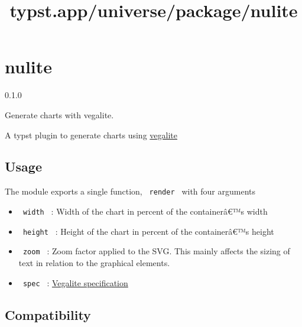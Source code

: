 \title{typst.app/universe/package/nulite}

\label{banner}
\section{nulite}\label{nulite}

{ 0.1.0 }

Generate charts with vegalite.

\label{readme}
A typst plugin to generate charts using
\href{https://vega.github.io/vega-lite/}{vegalite}

\subsection{Usage}\label{usage}

\begin{Shaded}
\begin{Highlighting}[]

\NormalTok{  )}
\end{Highlighting}
\end{Shaded}


The module exports a single function, \texttt{\ render\ } with four
arguments

\begin{itemize}
\tightlist
\item
  \texttt{\ width\ } : Width of the chart in percent of the
  containerâ€™s width
\item
  \texttt{\ height\ } : Height of the chart in percent of the
  containerâ€™s height
\item
  \texttt{\ zoom\ } : Zoom factor applied to the SVG. This mainly
  affects the sizing of text in relation to the graphical elements.
\item
  \texttt{\ spec\ } :
  \href{https://vega.github.io/vega-lite/docs/spec.html}{Vegalite
  specification}
\end{itemize}

\subsection{Compatibility}\label{compatibility}

